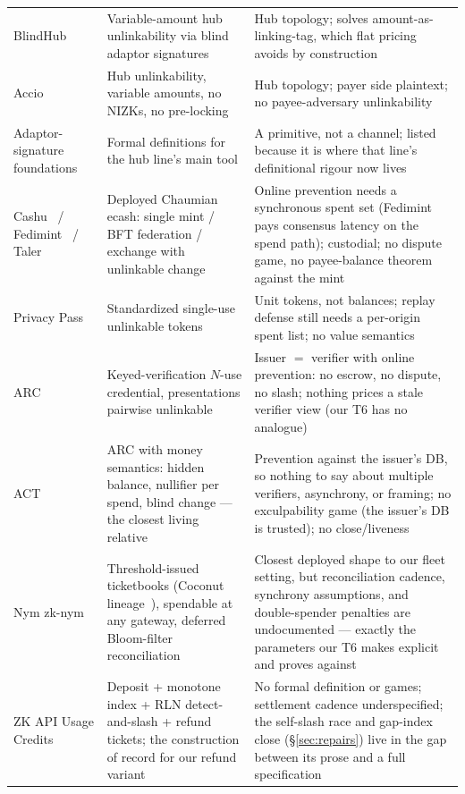 \documentclass[9pt]{extarticle}
\begin{document}
\begin{footnotesize}
\begin{longtable}{>{\raggedright\arraybackslash}p{}>{\raggedright\arraybackslash}p{}>{\raggedright\arraybackslash}p{}}
\addlinespace
BlindHub~\cite{blindhub2023} &
Variable-amount hub unlinkability via blind adaptor signatures &
Hub topology; solves amount-as-linking-tag, which flat pricing avoids by construction \\
\addlinespace
Accio~\cite{accio2023} &
Hub unlinkability, variable amounts, no NIZKs, no pre-locking &
Hub topology; payer side plaintext; no payee-adversary unlinkability \\
\addlinespace
Adaptor-signature foundations~\cite{adaptor2024} &
Formal definitions for the hub line's main tool &
A primitive, not a channel; listed because it is where that line's definitional rigour now lives \\
\addlinespace
Cashu~\cite{cashu} / Fedimint~\cite{fedimint} / Taler~\cite{taler2016} &
Deployed Chaumian ecash: single mint / BFT federation / exchange with unlinkable change &
Online prevention needs a synchronous spent set (Fedimint pays consensus latency on the spend path); custodial; no dispute game, no payee-balance theorem against the mint \\
\addlinespace
Privacy Pass~\cite{rfc9576} &
Standardized single-use unlinkable tokens &
Unit tokens, not balances; replay defense still needs a per-origin spent list; no value semantics \\
\addlinespace
ARC~\cite{arc2025} &
Keyed-verification $N$-use credential, presentations pairwise unlinkable &
Issuer $=$ verifier with online prevention: no escrow, no dispute, no slash; nothing prices a stale verifier view (our T6 has no analogue) \\
\addlinespace
ACT~\cite{act2025} &
ARC with money semantics: hidden balance, nullifier per spend, blind change --- the closest living relative &
Prevention against the issuer's DB, so nothing to say about multiple verifiers, asynchrony, or framing; no exculpability game (the issuer's DB is trusted); no close/liveness \\
\addlinespace
Nym zk-nym~\cite{nymzknym} &
Threshold-issued ticketbooks (Coconut lineage~\cite{coconut2018}), spendable at any gateway, deferred Bloom-filter reconciliation &
Closest deployed shape to our fleet setting, but reconciliation cadence, synchrony assumptions, and double-spender penalties are undocumented --- exactly the parameters our T6 makes explicit and proves against \\
\addlinespace
ZK API Usage Credits~\cite{crapisbuterin2026credits} &
Deposit + monotone index + RLN detect-and-slash + refund tickets; the construction of record for our refund variant &
No formal definition or games; settlement cadence underspecified; the self-slash race and gap-index close (\S\ref{sec:repairs}) live in the gap between its prose and a full specification \\

\end{longtable}
\end{footnotesize}
\end{document}
